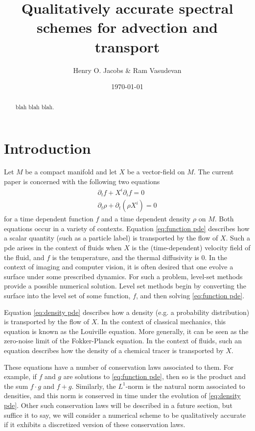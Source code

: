 \documentclass[12pt]{amsart}
\title{Qualitatively accurate spectral schemes for advection and transport}
\author{Henry O. Jacobs \& Ram Vasudevan}
\date{\today}
\begin{document}
\maketitle

\begin{abstract}
  blah blah blah.
\end{abstract}

\section{Introduction}
\label{sec:intro}

Let $M$ be a compact manifold and let $X$ be a vector-field on $M$. The current paper is concerned with the following two equations
\begin{align}
	\partial_{t} f + X^{i} \partial_{i} f = 0 \label{eq:function pde} \\
	\partial_{t} \rho + \partial_{t} (\rho X^{i}) = 0 \label{eq:density pde}
\end{align}
for a time dependent function $f$ and a time dependent density $\rho$ on $M$.
Both equations occur in a variety of contexts.
Equation \eqref{eq:function pde} describes how a scalar quantity (such as a particle label) is transported by the flow of $X$.
Such a pde arises in the context of fluids when $X$ is the (time-dependent) velocity field of the fluid, and $f$ is the temperature, and the thermal diffusivity is $0$.
In the context of imaging and computer vision, it is often desired that one evolve a surface under some prescribed dynamics.
For such a problem, level-set methods provide a possible numerical solution.
Level set methods begin by converting the surface into the level set of some function, $f$, and then solving \eqref{eq:function pde}.

Equation \eqref{eq:density pde} describes how a density (e.g. a probability distribution) is transported by the flow of $X$.
In the context of classical mechanics, this equation is known as the Louiville equation.
More generally, it can be seen as the zero-noise limit of the Fokker-Planck equation.
In the context of fluids, such an equation describes how the density of a chemical tracer is transported by $X$.

These equations have a number of conservation laws associated to them.
For example, if $f$ and $g$ are solutions to \eqref{eq:function pde},
then so is the product and the sum $f\cdot g$ and $f+g$.
Similarly, the $L^{1}$-norm is the natural norm associated to densities, and this norm is conserved in time under the evolution of \eqref{eq:density pde}.
Other such conservation laws will be described in a future section, but suffice it to say,
we will consider a numerical scheme to be qualitatively accurate if it exhibits a discretized version of these conservation laws. 
\end{document}

